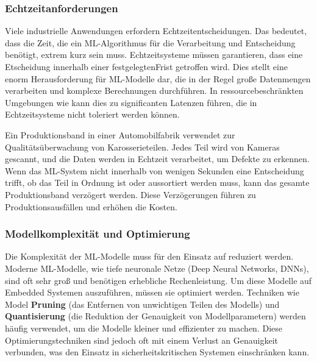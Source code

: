 \subsubsection{Echtzeitanforderungen}

Viele industrielle Anwendungen erfordern Echtzeitentscheidungen. Das bedeutet, dass die Zeit, die ein ML-Algorithmus für die 
Verarbeitung und Entscheidung benötigt, extrem kurz sein muss. Echtzeitsysteme müssen garantieren, dass eine Etscheidung innerhalb 
einer festgelegtenFrist getroffen wird. Dies stellt eine enorm Herausforderung für ML-Modelle dar, die in der Regel große Datenmengen
verarbeiten und komplexe Berechnungen durchführen. In ressourcebeschränkten Umgebungen wie \Emb kann dies zu significanten Latenzen 
führen, die in Echtzeitsysteme nicht toleriert werden können.

\begin{tcolorbox}[colback=myblue1, colframe=myblue3, coltitle=myblue5, title=Beispiel]
    Ein Produktionsband in einer Automobilfabrik verwendet \ML zur Qualitätsüberwachung von Karosserieteilen. 
    Jedes Teil wird von Kameras gescannt, und die Daten werden in Echtzeit verarbeitet, um Defekte zu erkennen. Wenn das ML-System 
    nicht innerhalb von wenigen Sekunden eine Entscheidung trifft, ob das Teil in Ordnung ist oder aussortiert werden muss, 
    kann das gesamte Produktionsband verzögert werden. Diese Verzögerungen führen zu Produktionsausfällen und erhöhen die Kosten.
    
    \end{tcolorbox}

\subsubsection{Modellkomplexität und Optimierung}

Die Komplexität der ML-Modelle muss für den Einsatz auf \Emb reduziert werden. Moderne ML-Modelle, wie tiefe neuronale 
Netze (Deep Neural Networks, DNNs), sind oft sehr groß und benötigen erhebliche Rechenleistung. Um diese Modelle auf Embedded 
Systemen auszuführen, müssen sie optimiert werden. Techniken wie Model \textbf{Pruning} (das Entfernen von unwichtigen Teilen des Modells) 
und \textbf{Quantisierung} (die Reduktion der Genauigkeit von Modellparametern) \cite{articleQuantization} werden häufig verwendet, um die Modelle kleiner und effizienter 
zu machen. Diese Optimierungstechniken sind jedoch oft mit einem Verlust an Genauigkeit verbunden, was den Einsatz in sicherheitskritischen 
Systemen einschränken kann.

